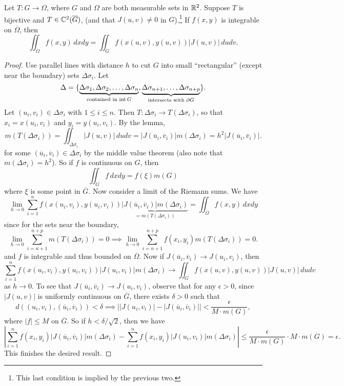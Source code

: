 \begin{theorem}
  Let $T : G \to \Omega$, where $G$ and $\Omega$ are
  both measurable sets in $\mathbb{R}^2$. Suppose $T$ is
  bijective and $T \in \mathbb{C}^2(\overline{G})$, (and that
  $J(u, v) \ne 0$ in $G$).\footnote{This last condition is implied by the previous two.} If $f(x, y)$ is integrable
  on $\overline{\Omega}$, then
  \[
    \iint_{\Omega} f(x, y)\, dxdy
    = \iint_G f(x(u, v), y(u, v)) |J(u, v)|\, dudv.
  \]
\end{theorem}

\begin{proof}
  Use parallel lines with distance $h$ to cut
  $G$ into small ``rectangular'' (except
  near the boundary) sets $\Delta \sigma_i$. Let
  \[
    \Delta = \{\underbrace{\Delta \sigma_1, \Delta \sigma_2, \dots, \Delta \sigma_n}_{\text{contained in $\operatorname{int} G$}}, \underbrace{\Delta \sigma_{n + 1}, \dots, \Delta \sigma_{n + p}}_{\text{intersects with $\partial G$}}\}.
  \]
  Let $(u_i, v_i) \in \Delta \sigma_i$ with
  $1 \le i \le n$. Then $T : \Delta \sigma_i \to T(\Delta \sigma_i)$,
  so that $x_i = x(u_i, v_i)$ and $y_i = y(u_i, v_i)$.
  By the lemma,
  \[
    m(T(\Delta \sigma_i)) = \iint_{\Delta \sigma_i} |J(u, v)|\, dudv
    = |J(\overline{u}_i, \overline{v}_i)| m(\Delta \sigma_i)
    = h^2 |J(\overline{u}_i, \overline{v}_i)|.
  \]
  for some $(\overline{u}_i, \overline{v}_i) \in \Delta \sigma_i$ by the middle value theorem
  (also note that $m(\Delta \sigma_i) = h^2$). So if
  $f$ is continuous on $G$, then
  \[
    \iint_G f\, dxdy = f(\xi) m(G)
  \]
  where $\xi$ is some point in $\overline{G}$. Now
  consider a limit of the Riemann sums. We have
  \[
    \lim_{h \to 0} \sum_{i = 1}^n f(x(u_i, v_i), y(u_i, v_i)) \underbrace{|J(\overline{u}_i, \overline{v}_i)| m(\Delta \sigma_i)}_{= m(T(\Delta \sigma_i))}
    = \iint_{\Omega} f(x, y)\, dxdy
  \]
  since for the sets near the boundary,
  \[
    \lim_{h \to 0} \sum_{i = n + 1}^{n + p} m(T(\Delta \sigma_i)) = 0 \implies
    \lim_{h \to 0} \sum_{i = n + 1}^{n + p} f(x_i, y_i) m(T(\Delta \sigma_i)) = 0.
  \]
  and $f$ is integrable and thus bounded on $\overline{\Omega}$.
  Now if $J(\overline{u}_i, \overline{v}_i) \to J(u_i, v_i)$,
  then
  \[
    \sum_{i = 1}^n f(x(u_i, v_i), y(u_i, v_i)) |J(u_i, v_i)| m(\Delta \sigma_i)
    \to \iint_G f(x(u, v), y(u, v)) |J(u, v)|\, dudv
  \]
  as $h \to 0$. To see that $J(\overline{u}_i, \overline{v}_i) \to J(u_i, v_i)$, observe that for
  any $\epsilon > 0$, since $|J(u, v)|$ is uniformly
  continuous on $\overline{G}$, there exists
  $\delta > 0$ such that
  \[
    d((u_i, v_i), (\overline{u}_i, \overline{v}_i)) < \delta
    \implies \left| |J(u_i, v_i)| - |J(\overline{u}_i, \overline{v}_i)| \right| < \frac{\epsilon}{M \cdot m(G)},
  \]
  where $|f| \le M$ on $\overline{G}$. So if
  $h < \delta / \sqrt{2}$, then we have
  \[
   \left| \sum_{i = 1}^n f(x_i, y_i) |J(\overline{u}_i, \overline{v}_i)| m(\Delta \sigma_i)
    - \sum_{i = 1}^n f(x_i, y_i) |J(u_i, v_i)| m(\Delta \sigma_i)\right|
    \le \frac{\epsilon}{M \cdot m(G)} \cdot M \cdot m(G) = \epsilon.
  \]
  This finishes the desired result.
\end{proof}


